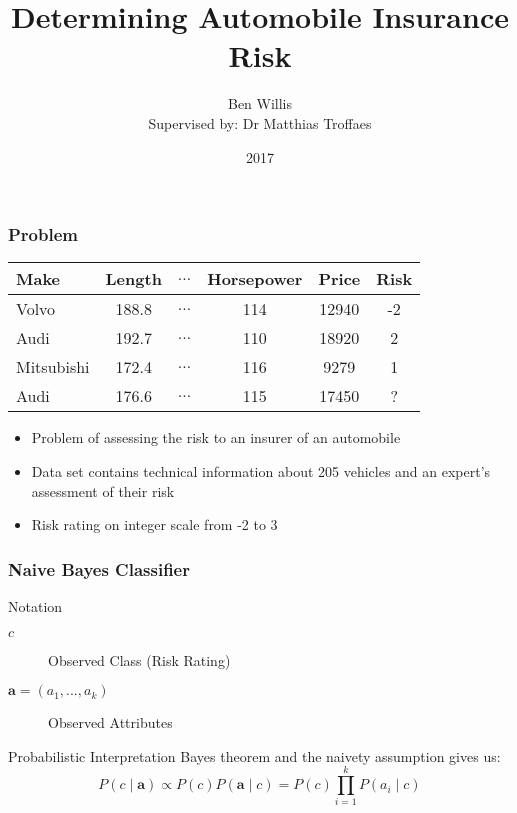 \documentclass{beamer}
\title{Determining Automobile Insurance Risk}
\author[Ben Willis]{Ben Willis \\ \scriptsize{ Supervised by: Dr Matthias Troffaes}}
\institute{Durham University}
\date{2017}
\begin{document}
 
\frame{\titlepage}

\begin{frame}
	\frametitle{Problem}
	\begin{center}
		\begin{tabular}{l c c c c|c}
			Make       & Length & $\dots$ & Horsepower & Price & Risk \\
			\hline
			Volvo      & 188.8  & $\dots$ & 114        & 12940 & -2   \\
			Audi       & 192.7  & $\dots$ & 110        & 18920 & 2    \\
			Mitsubishi & 172.4  & $\dots$ & 116        & 9279  & 1    \\
			Audi       & 176.6  & $\dots$ & 115        & 17450 & ?
		\end{tabular}
	\end{center}
	\begin{itemize}
		\item Problem of assessing the risk to an insurer of an automobile
		\item Data set contains technical information about 205 vehicles and an expert's assessment of their risk
		\item Risk rating on integer scale from -2 to 3
	\end{itemize}
\end{frame}

\begin{frame}
	\frametitle{Naive Bayes Classifier}
	\begin{block}{Notation}
		\begin{description}
			\item[$c$] Observed Class (Risk Rating)
			\item[$\mathbf{a} = (a_1,...,a_k)$] Observed Attributes
		\end{description}
	\end{block}
	\begin{block}{Probabilistic Interpretation}
		Bayes theorem and the naivety assumption gives us:
		\begin{equation}
			P(c \mid \mathbf{a}) \propto P(c)P(\mathbf{a} \mid c) = P(c)\prod_{i=1}^{k}P(a_i \mid c)
		\end{equation}
	\end{block}
\end{frame}
\end{document}
